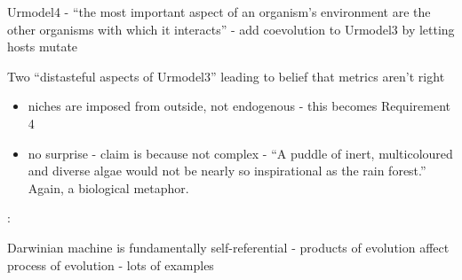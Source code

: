 	
	Urmodel4 - ``the most important aspect of an organism's environment
	are the other organisms with which it interacts'' - add coevolution to
	Urmodel3 by letting hosts mutate
	
	Two ``distasteful aspects of Urmodel3'' leading to belief that metrics
	aren't right
	
	
	\begin{itemize}
		\item
		
		niches are imposed from outside, not endogenous - this becomes
		Requirement 4
		
		\item
		
		no surprise - claim is because not complex - ``A puddle of inert,
		multicoloured and diverse algae would not be nearly so inspirational
		as the rain forest.'' Again, a biological metaphor.
		
	\end{itemize}


\autocite{Watson2015}:

	Darwinian machine is fundamentally self-referential - products of
	evolution affect process of evolution - lots of examples
	
